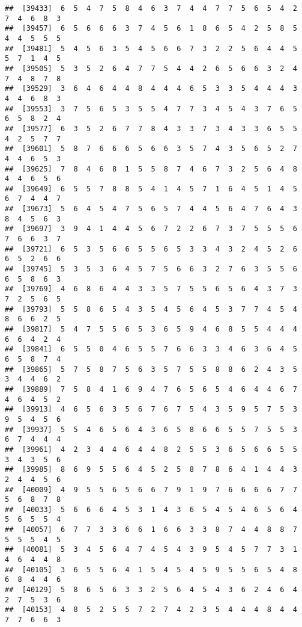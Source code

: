 \documentclass[
]{book}
\begin{document}
\begin{verbatim}
##  [39433]  6  5  4  7  5  8  4  6  3  7  4  4  7  7  5  6  5  4  2  7  4  6  8  3
##  [39457]  6  5  6  6  6  3  7  4  5  6  1  8  6  5  4  2  5  8  5  4  4  5  5  5
##  [39481]  5  4  5  6  3  5  4  5  6  6  7  3  2  2  5  6  4  4  5  5  7  1  4  5
##  [39505]  5  3  5  2  6  4  7  7  5  4  4  2  6  5  6  6  3  2  4  7  4  8  7  8
##  [39529]  3  6  4  6  4  4  8  4  4  4  6  5  3  3  5  4  4  4  3  4  4  6  8  3
##  [39553]  3  7  5  6  5  3  5  5  4  7  7  3  4  5  4  3  7  6  5  6  5  8  2  4
##  [39577]  6  3  5  2  6  7  7  8  4  3  3  7  3  4  3  3  6  5  5  4  2  5  7  7
##  [39601]  5  8  7  6  6  6  5  6  6  3  5  7  4  3  5  6  5  2  7  4  4  6  5  3
##  [39625]  7  8  4  6  8  1  5  5  8  7  4  6  7  3  2  5  6  4  8  4  4  6  5  6
##  [39649]  6  5  5  7  8  8  5  4  1  4  5  7  1  6  4  5  1  4  5  6  7  4  4  7
##  [39673]  5  6  4  5  4  7  5  6  5  7  4  4  5  6  4  7  6  4  3  8  4  5  6  3
##  [39697]  3  9  4  1  4  4  5  6  7  2  2  6  7  3  7  5  5  5  6  7  6  6  3  7
##  [39721]  6  5  3  5  6  6  5  5  6  5  3  3  4  3  2  4  5  2  6  6  5  2  6  6
##  [39745]  5  3  5  3  6  4  5  7  5  6  6  3  2  7  6  3  5  5  6  6  5  8  6  3
##  [39769]  4  6  8  6  4  4  3  3  5  7  5  5  6  5  6  4  3  7  3  7  2  5  6  5
##  [39793]  5  5  8  6  5  4  3  5  4  5  6  4  5  3  7  7  4  5  4  8  6  6  2  5
##  [39817]  5  4  7  5  5  6  5  3  6  5  9  4  6  8  5  5  4  4  4  6  6  4  2  4
##  [39841]  6  5  5  0  4  6  5  5  7  6  6  3  3  4  6  3  6  4  5  6  5  8  7  4
##  [39865]  5  7  5  8  7  5  6  3  5  7  5  5  8  8  6  2  4  3  5  3  4  4  6  2
##  [39889]  7  5  8  4  1  6  9  4  7  6  5  6  5  4  6  4  4  6  7  4  6  4  5  2
##  [39913]  4  6  5  6  3  5  6  7  6  7  5  4  3  5  9  5  7  5  3  9  5  4  5  6
##  [39937]  5  5  4  6  5  6  4  3  6  5  8  6  6  5  5  7  5  5  3  6  7  4  4  4
##  [39961]  4  2  3  4  4  6  4  4  8  2  5  5  3  6  5  6  6  5  5  3  4  3  5  6
##  [39985]  8  6  9  5  5  6  4  5  2  5  8  7  8  6  4  1  4  4  3  2  4  4  5  6
##  [40009]  4  9  5  5  6  5  6  6  7  9  1  9  7  6  6  6  6  7  7  5  6  8  7  8
##  [40033]  5  6  6  6  4  5  3  1  4  3  6  5  4  5  4  6  5  6  4  5  6  5  5  4
##  [40057]  6  7  7  3  3  6  6  1  6  6  3  3  8  7  4  4  8  8  7  5  5  5  4  5
##  [40081]  5  3  4  5  6  4  7  4  5  4  3  9  5  4  5  7  7  3  1  4  6  4  4  8
##  [40105]  3  6  5  5  6  4  1  5  4  5  4  5  9  5  5  6  5  4  8  6  8  4  4  6
##  [40129]  5  8  6  5  6  3  3  2  5  6  4  5  4  3  6  2  4  6  4  2  7  5  3  6
##  [40153]  4  8  5  2  5  5  7  2  7  4  2  3  5  4  4  4  8  4  4  7  7  6  6  3

\end{verbatim}
\end{document}
